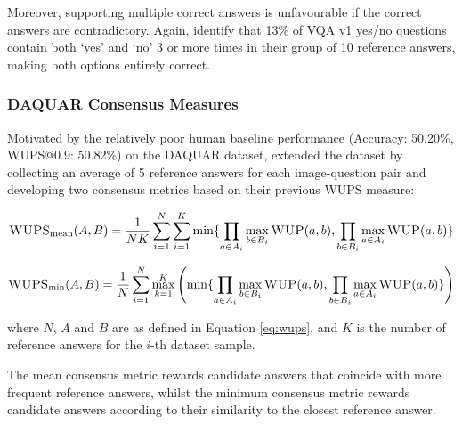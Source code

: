 Moreover, supporting multiple correct answers is unfavourable if the correct answers are contradictory. Again, \citeauthor{kafle2017visual} identify that 13\% of VQA v1 yes/no questions contain both `yes' and `no' 3 or more times in their group of 10 reference answers, making both options entirely correct.



\subsubsection{DAQUAR Consensus Measures}

Motivated by the relatively poor human baseline performance (Accuracy: 50.20\%, WUPS@0.9:  50.82\%) on the DAQUAR dataset, \citeauthor{malinowski2015ask} extended the dataset by collecting an average of 5 reference answers for each image-question pair and developing two consensus metrics based on their previous WUPS measure:

\begin{equation}
    \textsc{WUPS}_{\text{mean}}(A, B) =     \frac{1}{NK} \sum_{i=1}^N \sum_{i=1}^K \min \{\prod_{a \in A_i} \max_{b \in B_i} \textsc{WUP}(a, b), \prod_{b \in B_i} \max_{a \in A_i} \textsc{WUP}(a, b)\}
    \label{eq:wups_mean_consensus}
\end{equation}


\begin{equation}
    \textsc{WUPS}_{\text{min}}(A, B) =     \frac{1}{N} \sum_{i=1}^N \max_{k=1}^K \left( \min \{\prod_{a \in A_i} \max_{b \in B_i} \textsc{WUP}(a, b), \prod_{b \in B_i} \max_{a \in A_i} \textsc{WUP}(a, b)\} \right)
    \label{eq:wups_min_consensus}
\end{equation}

where \(N\), \(A\) and \(B\) are as defined in Equation \ref{eq:wups}, and \(K\) is the number of reference answers for the \(i\)-th dataset sample.

The mean consensus metric rewards candidate answers that coincide with more frequent reference answers, whilst the minimum consensus metric rewards candidate answers according to their similarity to the closest reference answer.

